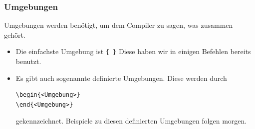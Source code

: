\begin{frame}[fragile]
\frametitle{Umgebungen}
\linespread{1.5}
Umgebungen werden benötigt, um dem Compiler zu sagen, was zusammen gehört. \pause
\begin{itemize}[<+->]
  \item Die einfachste Umgebung ist \lstinline[style=Latex]+{ }+ Diese haben wir in einigen Befehlen bereits benutzt.
  \item Es gibt auch sogenannte definierte Umgebungen. Diese werden durch
  	\begin{center}
\begin{lstlisting}[style=Latex] 
\begin{<Umgebung>}
\end{<Umgebung>}
\end{lstlisting}\end{center}\vspace{-30pt}
gekennzeichnet. Beispiele zu diesen definierten Umgebungen folgen morgen.
\end{itemize}
\end{frame}




